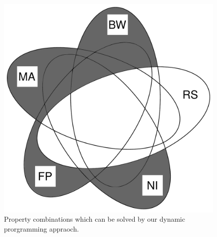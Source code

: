 \begin{figure}
\includegraphics[width=\columnwidth]{figs/venn_dp.pdf}
\caption{Property combinations which can be solved by our dynamic prorgramming 
appraoch.}
\label{fig:venn_dp}
\end{figure}

